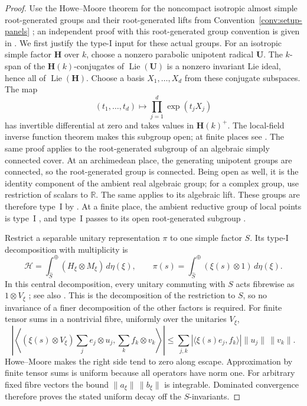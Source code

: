 \begin{proof}
Use the Howe--Moore theorem for the noncompact isotropic almost
simple root-generated groups and their root-generated lifts from
Convention~\ref{conv:setup-panels} \cite{HoweMoore1979}; an independent proof with this root-generated group convention is given in \cite[Theorem~1.1 and Definition~4.23]{Ciobotaru2015}.
We first justify the type-I
input for these actual groups.  For an isotropic simple factor
$\mathbf H$ over $k$, choose a nonzero parabolic unipotent radical
$\mathbf U$.  The $k$-span of the $\mathbf H(k)$-conjugates of
$\operatorname{Lie}(\mathbf U)$ is a nonzero invariant Lie ideal,
hence all of $\operatorname{Lie}(\mathbf H)$.  Choose a basis
$X_1,\ldots,X_d$ from these conjugate subspaces.  The map
\[
 (t_1,\ldots,t_d)\longmapsto\prod_{j=1}^d\exp(t_jX_j)
\]
has invertible differential at zero and takes values in
$\mathbf H(k)^+$.  The local-field inverse function theorem makes
this subgroup open; at finite places see
\cite[Proposition~1.11]{Gloeckner2008}.  The same proof applies to
the root-generated subgroup of an algebraic simply connected cover.
At an archimedean place, the generating unipotent groups are connected,
so the root-generated group is connected.  Being open as well, it is
the identity component of the ambient real algebraic group; for a
complex group, use restriction of scalars to $\mathbb R$.  The same
applies to its algebraic lift.  These groups are therefore type~I by
\cite[Theorem~1]{Dixmier1957}.  At a finite place, the ambient reductive
group of local points is type~I \cite{Bernstein1974}, and type~I passes
to its open root-generated subgroup
\cite[Proposition~6.E.21(1)]{BekkaHarpe2019}.

Restrict a separable unitary representation $\pi$ to one simple
factor $S$.  Its type-I decomposition with multiplicity is
\[
 \mathcal H=\int_{\widehat S}^{\oplus}
       (H_\xi\otimes M_\xi)\,d\eta(\xi),\qquad
 \pi(s)=\int_{\widehat S}^{\oplus}(\xi(s)\otimes1)\,d\eta(\xi).
\]
In this central decomposition, every unitary commuting with $S$
acts fibrewise as $1\otimes V_\xi$
\cite[Propositions~5.4.7 and~8.6.4, Theorem~8.6.6]{Dixmier1977};
see also \cite[Theorem~7.32]{Folland2015}.  This is the decomposition
of the restriction to $S$, so no invariance of a finer decomposition
of the other factors is required.  For finite tensor sums in a
nontrivial fibre, uniformly over the unitaries $V_\xi$,
\[
 \left|\left\langle(\xi(s)\otimes V_\xi)
       \sum_j e_j\otimes u_j,\sum_k f_k\otimes v_k\right\rangle\right|
 \leq\sum_{j,k}|\langle\xi(s)e_j,f_k\rangle|
                    \|u_j\|\,\|v_k\|.
\]
Howe--Moore makes the right side tend to zero along escape.
Approximation by finite tensor sums is uniform because all operators
have norm one.  For arbitrary fixed fibre vectors the bound
$\|a_\xi\|\,\|b_\xi\|$ is integrable.  Dominated convergence
therefore proves the stated uniform decay off the $S$-invariants.


\end{proof}
